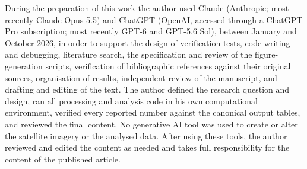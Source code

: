 \documentclass[
  authoryear,
  preprint]{elsarticle}
\begin{document}
During the preparation of this work the author used Claude (Anthropic;
most recently Claude Opus 5.5) and ChatGPT (OpenAI, accessed through a
ChatGPT Pro subscription; most recently GPT-6 and GPT-5.6 Sol), between
January and October 2026, in order to support the design of verification
tests, code writing and debugging, literature search, the specification
and review of the figure-generation scripts, verification of
bibliographic references against their original sources, organisation of
results, independent review of the manuscript, and drafting and editing
of the text. The author defined the research question and design, ran
all processing and analysis code in his own computational environment,
verified every reported number against the canonical output tables, and
reviewed the final content. No generative AI tool was used to create or
alter the satellite imagery or the analysed data. After using these
tools, the author reviewed and edited the content as needed and takes
full responsibility for the content of the published article.


  
\end{document}
